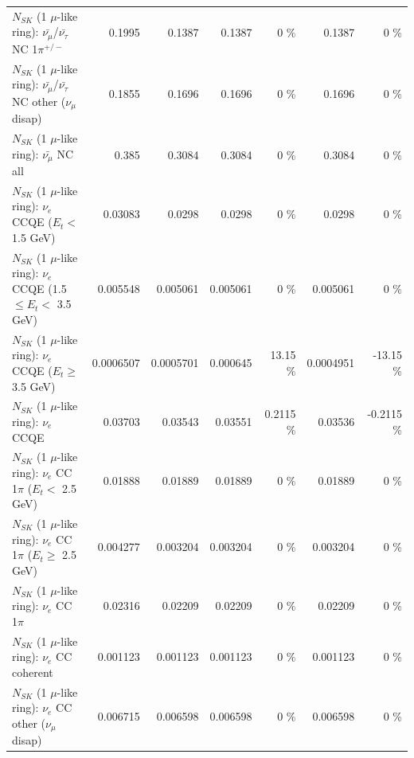 \begin{table}
\begin{tabular}{| l | r | r | r  r | r  r |}
\hline
  $N_{SK}$ (1 $\mu$-like ring): $\bar{\nu_\mu}$/$\bar{\nu_\tau}$ NC 1$\pi^{+/-}$ &          0.1995 &          0.1387 &          0.1387 &        0 \%  &          0.1387 &        0 \%  \\ 
$N_{SK}$ (1 $\mu$-like ring): $\bar{\nu_\mu}$/$\bar{\nu_\tau}$ NC other ($\nu_\mu$ disap) &          0.1855 &          0.1696 &          0.1696 &        0 \%  &          0.1696 &        0 \%  \\ 
                          $N_{SK}$ (1 $\mu$-like ring): $\bar{\nu_{\mu}}$ NC all &           0.385 &          0.3084 &          0.3084 &        0 \%  &          0.3084 &        0 \%  \\ 
\hline
\hline
\hline
                  $N_{SK}$ (1 $\mu$-like ring): $\nu_e$ CCQE ($E_{t} <$ 1.5 GeV) &         0.03083 &          0.0298 &          0.0298 &        0 \%  &          0.0298 &        0 \%  \\ 
         $N_{SK}$ (1 $\mu$-like ring): $\nu_e$ CCQE (1.5 $\leq E_{t} <$ 3.5 GeV) &        0.005548 &        0.005061 &        0.005061 &        0 \%  &        0.005061 &        0 \%  \\ 
               $N_{SK}$ (1 $\mu$-like ring): $\nu_e$ CCQE ($E_{t} \geq$ 3.5 GeV) &       0.0006507 &       0.0005701 &        0.000645 &    13.15 \%  &       0.0004951 &   -13.15 \%  \\ 
\hline
                                      $N_{SK}$ (1 $\mu$-like ring): $\nu_e$ CCQE &         0.03703 &         0.03543 &         0.03551 &   0.2115 \%  &         0.03536 &  -0.2115 \%  \\ 
\hline
             $N_{SK}$ (1 $\mu$-like ring): $\nu_e$ CC 1$\pi$ ($E_{t} <$ 2.5 GeV) &         0.01888 &         0.01889 &         0.01889 &        0 \%  &         0.01889 &        0 \%  \\ 
          $N_{SK}$ (1 $\mu$-like ring): $\nu_e$ CC 1$\pi$ ($E_{t} \geq$ 2.5 GeV) &        0.004277 &        0.003204 &        0.003204 &        0 \%  &        0.003204 &        0 \%  \\ 
\hline
                                 $N_{SK}$ (1 $\mu$-like ring): $\nu_e$ CC 1$\pi$ &         0.02316 &         0.02209 &         0.02209 &        0 \%  &         0.02209 &        0 \%  \\ 
                               $N_{SK}$ (1 $\mu$-like ring): $\nu_e$ CC coherent &        0.001123 &        0.001123 &        0.001123 &        0 \%  &        0.001123 &        0 \%  \\ 
                $N_{SK}$ (1 $\mu$-like ring): $\nu_e$ CC other ($\nu_\mu$ disap) &        0.006715 &        0.006598 &        0.006598 &        0 \%  &        0.006598 &        0 \%  \\ 

\end{tabular}
\end{table}
